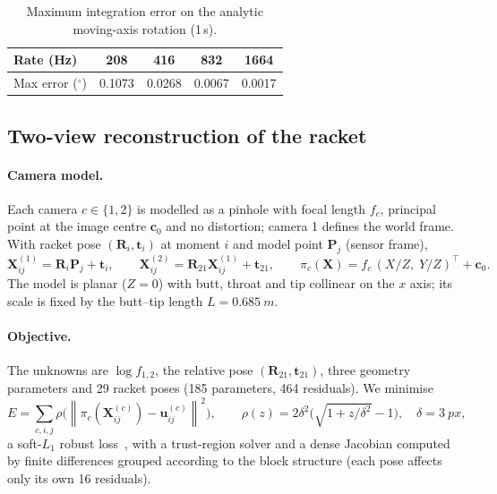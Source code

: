 \documentclass[11pt,a4paper]{article}
\newcommand{\Rm}{\mathbf{R}}
\newcommand{\ve}[1]{\bm{#1}}
\newcommand{\dg}{^{\circ}}
\newcommand{\norm}[1]{\left\lVert #1 \right\rVert}
\begin{document}
\begin{table}[H]\centering\small
\caption{Maximum integration error on the analytic moving-axis rotation (1\,s).}\label{tab:conv}
\begin{tabular}{@{}lcccc@{}}\toprule
Rate (Hz) & 208 & 416 & 832 & 1664 \\\midrule
Max error ($\dg$) & 0.1073 & 0.0268 & 0.0067 & 0.0017 \\\bottomrule
\end{tabular}
\end{table}

\subsection{Two-view reconstruction of the racket}\label{sec:ba}
\paragraph{Camera model.} Each camera $c\in\{1,2\}$ is modelled as a pinhole with focal length
$f_c$, principal point at the image centre $\ve c_0$ and no distortion; camera 1 defines the world
frame. With racket pose $(\Rm_i,\ve t_i)$ at moment $i$ and model point $\ve P_j$ (sensor frame),
\begin{equation}
\ve X^{(1)}_{ij}=\Rm_i\ve P_j+\ve t_i,\qquad
\ve X^{(2)}_{ij}=\Rm_{21}\ve X^{(1)}_{ij}+\ve t_{21},\qquad
\pi_c(\ve X)=f_c\,(X/Z,\;Y/Z)^{\top}+\ve c_0 .
\end{equation}
The model is planar ($Z=0$) with butt, throat and tip collinear on the $x$ axis; its scale is fixed
by the butt--tip length $L=\SI{0.685}{m}$.

\paragraph{Objective.} The unknowns are $\log f_{1,2}$, the relative pose
$(\Rm_{21},\ve t_{21})$, three geometry parameters and 29 racket poses (185 parameters, 464
residuals). We minimise
\begin{equation}
E=\sum_{c,i,j}\rho\bigl(\norm{\pi_c(\ve X^{(c)}_{ij})-\ve u^{(c)}_{ij}}^2\bigr),\qquad
\rho(z)=2\delta^2\bigl(\sqrt{1+z/\delta^2}-1\bigr),\quad \delta=\SI{3}{px},
\label{eq:ba}
\end{equation}
a soft-$L_1$ robust loss~\cite{triggs2000}, with a trust-region solver and a dense Jacobian
computed by finite differences grouped according to the block structure (each pose affects only its
own 16 residuals).
\end{document}

